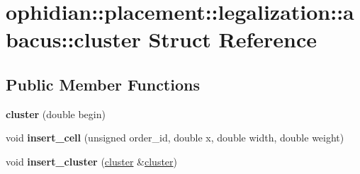 \hypertarget{structophidian_1_1placement_1_1legalization_1_1abacus_1_1cluster}{\section{ophidian\-:\-:placement\-:\-:legalization\-:\-:abacus\-:\-:cluster Struct Reference}
\label{structophidian_1_1placement_1_1legalization_1_1abacus_1_1cluster}
}
\subsection*{Public Member Functions}
\begin{DoxyCompactItemize}
\item 
\hypertarget{structophidian_1_1placement_1_1legalization_1_1abacus_1_1cluster_a3165f1180fe273e251c9b4905cc49857}{{\bfseries cluster} (double begin)}\label{structophidian_1_1placement_1_1legalization_1_1abacus_1_1cluster_a3165f1180fe273e251c9b4905cc49857}

\item 
\hypertarget{structophidian_1_1placement_1_1legalization_1_1abacus_1_1cluster_af07e0fc3b2e51d3c5872deca4ae8f019}{void {\bfseries insert\-\_\-cell} (unsigned order\-\_\-id, double x, double width, double weight)}\label{structophidian_1_1placement_1_1legalization_1_1abacus_1_1cluster_af07e0fc3b2e51d3c5872deca4ae8f019}

\item 
\hypertarget{structophidian_1_1placement_1_1legalization_1_1abacus_1_1cluster_aad2a718cd68cedc87c4d8c2d467530f7}{void {\bfseries insert\-\_\-cluster} (\hyperlink{structophidian_1_1placement_1_1legalization_1_1abacus_1_1cluster}{cluster} \&\hyperlink{structophidian_1_1placement_1_1legalization_1_1abacus_1_1cluster}{cluster})}\label{structophidian_1_1placement_1_1legalization_1_1abacus_1_1cluster_aad2a718cd68cedc87c4d8c2d467530f7}

\end{DoxyCompactItemize}
